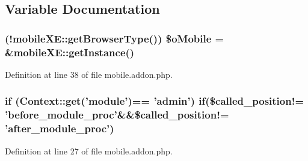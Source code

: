\subsection{Variable Documentation}
\hypertarget{mobile_8addon_8php_a2e1472c6f1bb5b341e95a632164904d0}{
\subsubsection[{\$o\-Mobile}]{ (!{\bf mobile\-X\-E\-::get\-Browser\-Type}()) \$o\-Mobile = \&{\bf mobile\-X\-E\-::get\-Instance}()}}\label{mobile_8addon_8php_a2e1472c6f1bb5b341e95a632164904d0}


Definition at line 38 of file mobile.\-addon.\-php.

\hypertarget{mobile_8addon_8php_a13d720e0d3597438cb76873850ce4b63}{
\subsubsection[{if}]{\setlength{\rightskip}{0pt plus 5cm}if ({\bf Context\-::get}('{\bf module}')== '{\bf admin}') if(\$called\-\_\-position!= 'before\-\_\-module\-\_\-proc'\&\&\$called\-\_\-position!= 'after\-\_\-module\-\_\-proc')}}\label{mobile_8addon_8php_a13d720e0d3597438cb76873850ce4b63}


Definition at line 27 of file mobile.\-addon.\-php.


